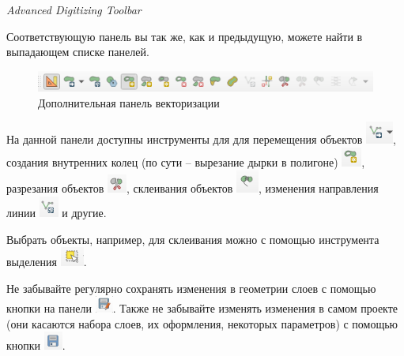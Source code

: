 \documentclass[
  12pt,
]{book}
\begin{document}
\emph{Advanced Digitizing Toolbar}

Соответствующую панель вы так же, как и предыдущую, можете найти в выпадающем списке панелей.

\begin{figure}
\centering
\includegraphics{images/Practice/Additional_panel.png}
\caption{Дополнительная панель векторизации}
\end{figure}

На данной панели доступны инструменты для для перемещения объектов \includegraphics{images/Practice/Move.png}, создания внутренних колец (по сути -- вырезание дырки в полигоне) \includegraphics{images/Practice/Hole.png}, разрезания объектов \includegraphics{images/Practice/Split.png}, склеивания объектов \includegraphics{images/Practice/Merge.png}, изменения направления линии \includegraphics{images/Practice/Flip.png} и другие.

Выбрать объекты, например, для склеивания можно с помощью инструмента выделения \includegraphics{images/Practice/Selection_tool.png}.

Не забывайте регулярно сохранять изменения в геометрии слоев с помощью кнопки на панели \includegraphics{images/Practice/Save_edits.png}. Также не забывайте изменять изменения в самом проекте (они касаются набора слоев, их оформления, некоторых параметров) с помощью кнопки \includegraphics{images/Practice/Save_project.png}.
\end{document}
